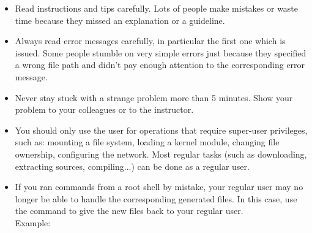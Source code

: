 \begin{itemize}

\item Read instructions and tips carefully. Lots of people make
  mistakes or waste time because they missed an explanation or a
  guideline.

\item Always read error messages carefully, in particular the first
  one which is issued. Some people stumble on very simple errors just
  because they specified a wrong file path and didn't pay enough
  attention to the corresponding error message.

\item Never stay stuck with a strange problem more than 5
  minutes. Show your problem to your colleagues or to the instructor.

\item You should only use the  user for operations that require
  super-user privileges, such as: mounting a file system, loading a
  kernel module, changing file ownership, configuring the
  network. Most regular tasks (such as downloading, extracting
  sources, compiling...) can be done as a regular user.

\item If you ran commands from a root shell by mistake, your regular
  user may no longer be able to handle the corresponding generated
  files. In this case, use the  command to give the new
  files back to your regular user.\\
  Example: 

\end{itemize}
